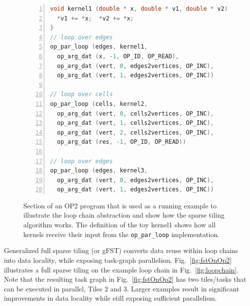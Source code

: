 \begin{figure}
\begin{lstlisting}[numbers=left,language=C, basicstyle=\scriptsize, xleftmargin=0.06\linewidth]
void kernel1 (double * x, double * v1, double * v2) {
  *v1 += *x;  *v2 += *x;
}
// loop over edges
op_par_loop (edges, kernel1,
  op_arg_dat (x, -1, OP_ID, OP_READ),
  op_arg_dat (vert, 0, edges2vertices, OP_INC),
  op_arg_dat (vert, 1, edges2vertices, OP_INC))

// loop over cells
op_par_loop (cells, kernel2,
  op_arg_dat (vert, 0, cells2vertices, OP_INC),
  op_arg_dat (vert, 1, cells2vertices, OP_INC),
  op_arg_dat (vert, 2, cells2vertices, OP_INC),
  op_arg_dat (res, -1, OP_ID, OP_READ))

// loop over edges
op_par_loop (edges, kernel3,
  op_arg_dat (vert, 0, edges2vertices, OP_INC),
  op_arg_dat (vert, 1, edges2vertices, OP_INC))
\end{lstlisting}
  \caption{Section of an OP2 program that is used as a running example to
  illustrate the loop chain abstraction and
  show how the sparse tiling algorithm works.  The definition of the toy
  kernel1 shows how all kernels receive their input from the {\tt op\_par\_loop}
  implementation.}
\label{fig:op2-programexample}
\end{figure}



Generalized full sparse tiling (or gFST) converts data reuse
within loop chains into data locality, while exposing task-graph
parallelism.
Fig.~\ref{fig:fstOnOp2} illustrates a full sparse tiling on the 
example loop chain in Fig.~\ref{fig:loopchain}.  Note that the
resulting task graph in Fig.~\ref{fig:fstOnOp2} has two tiles/tasks
that can be executed in parallel, Tiles 2 and 3.  Larger examples result in 
significant improvements in data locality while still
exposing sufficient parallelism.



